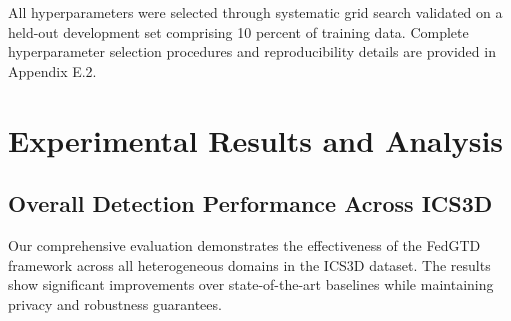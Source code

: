 \documentclass[12pt,a4paper]{article}
\theoremstyle{definition}
\begin{document}
All hyperparameters were selected through systematic grid search validated on a held-out development set comprising 10 percent of training data. Complete hyperparameter selection procedures and reproducibility details are provided in Appendix E.2.

\section{Experimental Results and Analysis}

\subsection{Overall Detection Performance Across ICS3D}

Our comprehensive evaluation demonstrates the effectiveness of the FedGTD framework across all heterogeneous domains in the ICS3D dataset. The results show significant improvements over state-of-the-art baselines while maintaining privacy and robustness guarantees.
\end{document}
